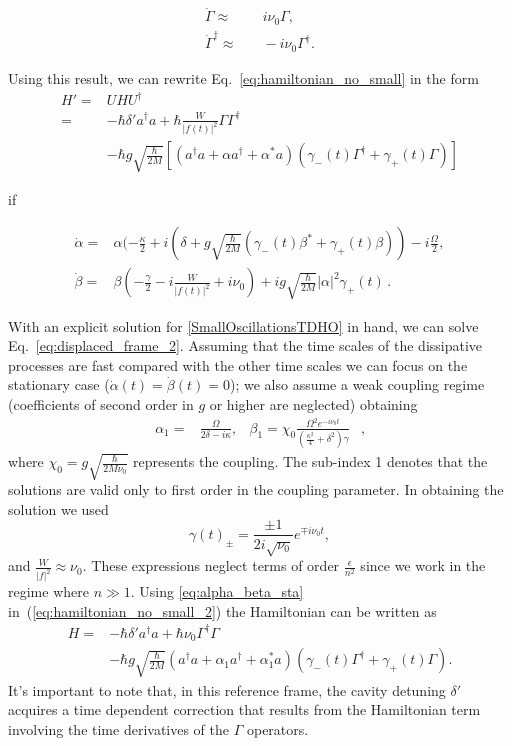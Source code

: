 \documentclass[reprint, amsmath,amssymb, aps,pra]{revtex4-1}
\begin{document}
\begin{align}\label{eq:DotGammavsGamma}
\dot{\Gamma} \approx & \quad i\nu_0\Gamma,\\
\dot{\Gamma}^\dagger \approx & \quad -i\nu_0\Gamma^\dagger.
\end{align}

Using this  result, we can rewrite Eq.~\eqref{eq:hamiltonian_no_small} in the form
\begin{align}\label{eq:hamiltonian_no_small_2}
  H'=&U H U^\dagger\nonumber\\=& -\hbar \delta' a^\dagger a + \hbar\frac{W}{|f(t)|^2}\Gamma \Gamma^\dagger\nonumber\\
     &-\hbar g\sqrt{\frac{\hbar}{2M}}[(a^{\dagger}a +\alpha a^{\dagger}+\alpha^* a)(\gamma_-(t)\Gamma^{\dagger}+\gamma_+(t)\Gamma)]
\end{align}

if 

\begin{align}\label{eq:displaced_frame_2}
\dot{\alpha} =& \alpha(-\frac{\kappa}{2}+i(\delta+g\sqrt{\frac{\hbar}{2M}}(\gamma_-(t) \beta^* + \gamma_+(t) \beta))-i\frac{\Omega}{2},\\
\dot{\beta} =& \beta(-\frac{\gamma}{2}-i\frac{W}{|f(t)|^2}+i\nu_0)+ig\sqrt{\frac{\hbar}{2M}}|\alpha|^2\gamma_+(t)\, .
\end{align}

With an explicit solution for \eqref{SmallOscillationsTDHO} in hand,
we can solve Eq.~\eqref{eq:displaced_frame_2}. Assuming that the time
scales of the dissipative processes are fast compared with the other
time scales we can focus on the stationary case
($\dot{\alpha}(t)=\dot{\beta}(t)=0$); we also assume a weak coupling
regime (coefficients of second order in $g$ or higher are neglected)
obtaining
\begin{align}\label{eq:alpha_beta_sta}
\alpha_1 =& \frac{\Omega}{2\delta-i\kappa},& \beta_1 =\chi_0\frac{\Omega^2 e^{-i\nu_0 t}}{(\frac{\kappa^2}{4}+\delta^2)\gamma}& ,
\end{align} where  $\chi_0 = g\sqrt{\frac{\hbar}{2M\nu_0}}$ represents the coupling.
The  sub-index 1 denotes that the solutions are valid only to first
order in the coupling parameter.  In obtaining the solution we used
\begin{equation}\label{GammaCoefficients}
\gamma(t)_\pm= \frac{\pm 1}{2i\sqrt{\nu_0}}e^{\mp i\nu_0 t},
\end{equation}
and  $\frac{W}{|f|^2} \approx \nu_0$. These expressions neglect terms of order $\frac{\epsilon}{n^2}$  since we work in the regime where $n \gg 1$. Using \eqref{eq:alpha_beta_sta} in~(\ref{eq:hamiltonian_no_small_2})
the Hamiltonian can be written as
\begin{align}
H =& -\hbar \delta' a^{\dagger}a +\hbar\nu_0\Gamma^{\dagger}\Gamma \\
&-\hbar g\sqrt{\frac{\hbar}{2M}}(a^{\dagger}a +\alpha_1 a^{\dagger}+\alpha^*_1 a)(\gamma_-(t)\Gamma^{\dagger}+\gamma_+(t)\Gamma)\nonumber.
\end{align} It's important to note that, in this reference frame, the cavity detuning $\delta'$ acquires a time dependent correction that results from the Hamiltonian term involving the time derivatives of the $\Gamma$ operators. 
\end{document}
